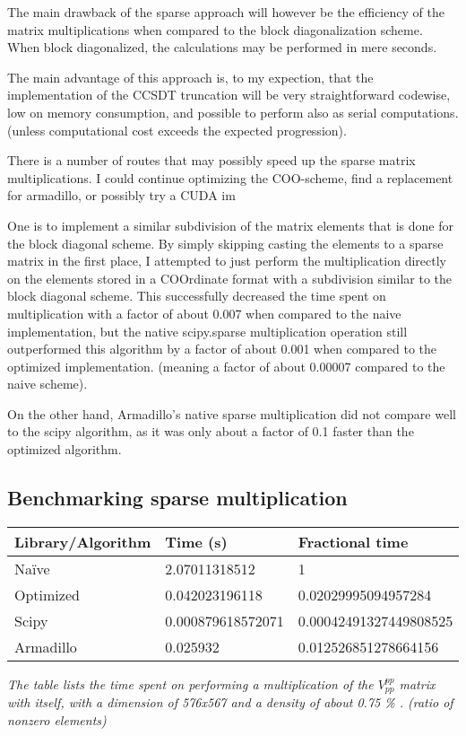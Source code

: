 \documentclass{article}
\begin{document}
The main drawback of the sparse approach will however be the efficiency
of the matrix multiplications when compared to the block diagonalization
scheme. When block diagonalized, the calculations may be performed in
mere seconds.

The main advantage of this approach is, to my expection, that the
implementation of the CCSDT truncation will be very straightforward
codewise, low on memory consumption, and possible to perform also as
serial computations. (unless computational cost exceeds the expected
progression).

There is a number of routes that may possibly speed up the sparse matrix
multiplications. I could continue optimizing the COO-scheme, find a
replacement for armadillo, or possibly try a CUDA im

One is to implement a similar subdivision of the matrix elements that is
done for the block diagonal scheme. By simply skipping casting the
elements to a sparse matrix in the first place, I attempted to just
perform the multiplication directly on the elements stored in a
COOrdinate format with a subdivision similar to the block diagonal
scheme. This successfully decreased the time spent on multiplication
with a factor of about 0.007 when compared to the naive implementation,
but the native scipy.sparse multiplication operation still outperformed
this algorithm by a factor of about 0.001 when compared to the optimized
implementation. (meaning a factor of about 0.00007 compared to the naive
scheme).

On the other hand, Armadillo's native sparse multiplication did not
compare well to the scipy algorithm, as it was only about a factor of
0.1 faster than the optimized algorithm.

    \subsection{Benchmarking sparse
multiplication}\label{benchmarking-sparse-multiplication}

\begin{longtable}[c]{@{}lll@{}}
\toprule
Library/Algorithm & Time (s) & Fractional time\tabularnewline
\midrule
\endhead
Naïve & 2.07011318512 & 1\tabularnewline
Optimized & 0.042023196118 & 0.02029995094957284\tabularnewline
Scipy & 0.000879618572071 & 0.00042491327449808525\tabularnewline
Armadillo & 0.025932 & 0.012526851278664156\tabularnewline
\bottomrule
\end{longtable}

\emph{The table lists the time spent on performing a multiplication of
the \(V_{pp}^{pp}\) matrix with itself, with a dimension of 576x567 and
a density of about 0.75 \% . (ratio of nonzero elements)}
\end{document}
